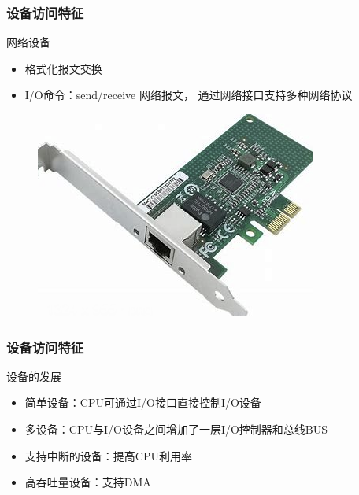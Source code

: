 \begin{frame}[fragile]
    \frametitle{设备访问特征}
    网络设备
    \begin{itemize}
        \item 格式化报文交换
        \item I/O命令：send/receive 网络报文， 通过网络接口支持多种网络协议
    \end{itemize}
    \begin{figure}
        \includegraphics[width=0.3\linewidth]{figs/net-dev.png}
    \end{figure}
\end{frame}
\begin{frame}[fragile]
    \frametitle{设备访问特征}
    设备的发展
    \begin{itemize}
        \item 简单设备：CPU可通过I/O接口直接控制I/O设备
        \item 多设备：CPU与I/O设备之间增加了一层I/O控制器和总线BUS
        \item 支持中断的设备：提高CPU利用率
        \item 高吞吐量设备：支持DMA
    \end{itemize}
\end{frame}
